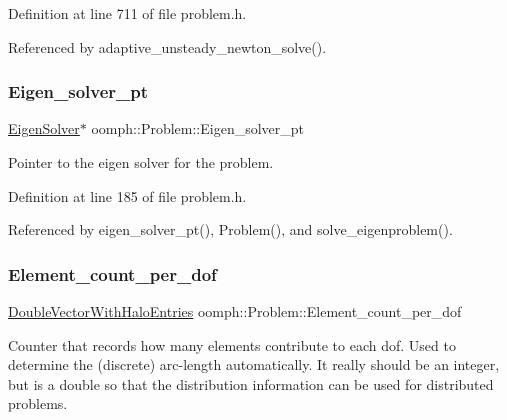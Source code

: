 Definition at line 711 of file problem.\+h.



Referenced by adaptive\+\_\+unsteady\+\_\+newton\+\_\+solve().

\mbox{\label{classoomph_1_1Problem_ab7938313fa45df9be16515a6b0bfd324}} 
\subsubsection{\texorpdfstring{Eigen\+\_\+solver\+\_\+pt}{Eigen\_solver\_pt}}
{\footnotesize\ttfamily \hyperlink{classoomph_1_1EigenSolver}{Eigen\+Solver}$\ast$ oomph\+::\+Problem\+::\+Eigen\+\_\+solver\+\_\+pt\hspace{0.3cm}{\ttfamily [private]}}



Pointer to the eigen solver for the problem. 



Definition at line 185 of file problem.\+h.



Referenced by eigen\+\_\+solver\+\_\+pt(), Problem(), and solve\+\_\+eigenproblem().

\mbox{\label{classoomph_1_1Problem_ae4177b73a790b80d541b416d1e83c6c3}} 
\subsubsection{\texorpdfstring{Element\+\_\+count\+\_\+per\+\_\+dof}{Element\_count\_per\_dof}}
{\footnotesize\ttfamily \hyperlink{classoomph_1_1DoubleVectorWithHaloEntries}{Double\+Vector\+With\+Halo\+Entries} oomph\+::\+Problem\+::\+Element\+\_\+count\+\_\+per\+\_\+dof\hspace{0.3cm}{\ttfamily [protected]}}



Counter that records how many elements contribute to each dof. Used to determine the (discrete) arc-\/length automatically. It really should be an integer, but is a double so that the distribution information can be used for distributed problems. 



